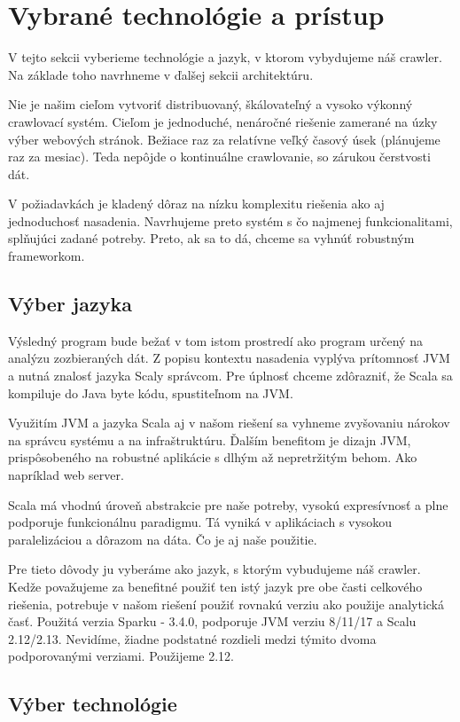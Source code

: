 \section{Vybrané technológie a prístup}
V tejto sekcii vyberieme technológie a jazyk, v ktorom vybydujeme náš crawler. Na základe toho navrhneme v ďalšej sekcii architektúru. 

Nie je našim cieľom vytvoriť distribuovaný, škálovateľný a vysoko výkonný crawlovací systém. Cieľom je jednoduché, nenáročné riešenie zamerané na úzky výber webových stránok. Bežiace raz za relatívne veľký časový úsek (plánujeme raz za mesiac). Teda nepôjde o kontinuálne crawlovanie, so zárukou čerstvosti dát. 

V požiadavkách je kladený dôraz na nízku komplexitu riešenia ako aj jednoduchosť nasadenia. Navrhujeme preto systém s čo najmenej funkcionalitami, splňujúci zadané potreby. Preto, ak sa to dá, chceme sa vyhnúť robustným frameworkom. 

\subsection{Výber jazyka}
Výsledný program bude bežať v tom istom prostredí ako program určený na analýzu zozbieraných dát. Z popisu kontextu nasadenia vyplýva prítomnosť JVM a nutná znalosť jazyka Scaly správcom. Pre úplnosť chceme zdôrazniť, že Scala sa kompiluje do Java byte kódu, spustiteľnom na JVM.

Využitím JVM a jazyka Scala aj v našom riešení sa vyhneme zvyšovaniu nárokov na správcu systému a na infraštruktúru. Ďalším benefitom je dizajn JVM, prispôsobeného na robustné aplikácie s dlhým až nepretržitým behom. Ako napríklad web server. 

Scala má vhodnú úroveň abstrakcie pre naše potreby, vysokú expresívnosť a plne podporuje funkcionálnu paradigmu. Tá vyniká v aplikáciach s vysokou paralelizáciou a dôrazom na dáta. Čo je aj naše použitie. 

Pre tieto dôvody ju vyberáme ako jazyk, s ktorým vybudujeme náš crawler. Kedže považujeme za benefitné použiť ten istý jazyk pre obe časti celkového riešenia, potrebuje v našom riešení použiť rovnakú verziu ako použije analytická časť. Použitá verzia Sparku - 3.4.0, podporuje JVM verziu 8/11/17 a Scalu 2.12/2.13. Nevidíme, žiadne podstatné rozdieli medzi týmito dvoma podporovanými verziami. Použijeme 2.12. 

\subsection{Výber technológie}



